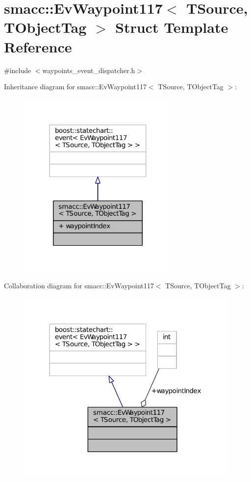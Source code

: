 \hypertarget{structsmacc_1_1EvWaypoint117}{}\section{smacc\+:\+:Ev\+Waypoint117$<$ T\+Source, T\+Object\+Tag $>$ Struct Template Reference}
\label{structsmacc_1_1EvWaypoint117}


{\ttfamily \#include $<$waypoints\+\_\+event\+\_\+dispatcher.\+h$>$}



Inheritance diagram for smacc\+:\+:Ev\+Waypoint117$<$ T\+Source, T\+Object\+Tag $>$\+:
\nopagebreak
\begin{figure}[H]
\begin{center}
\leavevmode
\includegraphics[width=227pt]{structsmacc_1_1EvWaypoint117__inherit__graph}
\end{center}
\end{figure}


Collaboration diagram for smacc\+:\+:Ev\+Waypoint117$<$ T\+Source, T\+Object\+Tag $>$\+:
\nopagebreak
\begin{figure}[H]
\begin{center}
\leavevmode
\includegraphics[width=312pt]{structsmacc_1_1EvWaypoint117__coll__graph}
\end{center}
\end{figure}
